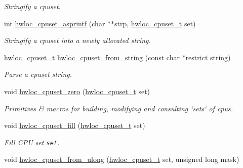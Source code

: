 \begin{CompactItemize}
\begin{CompactList}\small\item\em Stringify a cpuset. \item\end{CompactList}\item 
int \hyperlink{group__hwlocality__cpuset_ge2ebb56edf26097a355f24d859c56713}{hwloc\_\-cpuset\_\-asprintf} (char $\ast$$\ast$strp, \hyperlink{group__hwlocality__cpuset_g82e51d695c430832b703dad5ab8d75e4}{hwloc\_\-cpuset\_\-t} set)
\begin{CompactList}\small\item\em Stringify a cpuset into a newly allocated string. \item\end{CompactList}\item 
\hyperlink{group__hwlocality__cpuset_g82e51d695c430832b703dad5ab8d75e4}{hwloc\_\-cpuset\_\-t} \hyperlink{group__hwlocality__cpuset_g63e62db35640c1b90684952d7a3b5175}{hwloc\_\-cpuset\_\-from\_\-string} (const char $\ast$restrict string)
\begin{CompactList}\small\item\em Parse a cpuset string. \item\end{CompactList}\item 
void \hyperlink{group__hwlocality__cpuset_g4d63507128a35e6eda3fa6104970ac99}{hwloc\_\-cpuset\_\-zero} (\hyperlink{group__hwlocality__cpuset_g82e51d695c430832b703dad5ab8d75e4}{hwloc\_\-cpuset\_\-t} set)
\begin{CompactList}\small\item\em Primitives \& macros for building, modifying and consulting \char`\"{}sets\char`\"{} of cpus. \item\end{CompactList}\item 
void \hyperlink{group__hwlocality__cpuset_gd1a6c02ae378aff412c2b843cf8cc3f4}{hwloc\_\-cpuset\_\-fill} (\hyperlink{group__hwlocality__cpuset_g82e51d695c430832b703dad5ab8d75e4}{hwloc\_\-cpuset\_\-t} set)
\begin{CompactList}\small\item\em Fill CPU set {\tt set}. \item\end{CompactList}\item 
void \hyperlink{group__hwlocality__cpuset_g1dbccf3bbf6e6ec0464bfd9e4d47e5cb}{hwloc\_\-cpuset\_\-from\_\-ulong} (\hyperlink{group__hwlocality__cpuset_g82e51d695c430832b703dad5ab8d75e4}{hwloc\_\-cpuset\_\-t} set, unsigned long mask)
$$
\end{CompactItemize}

